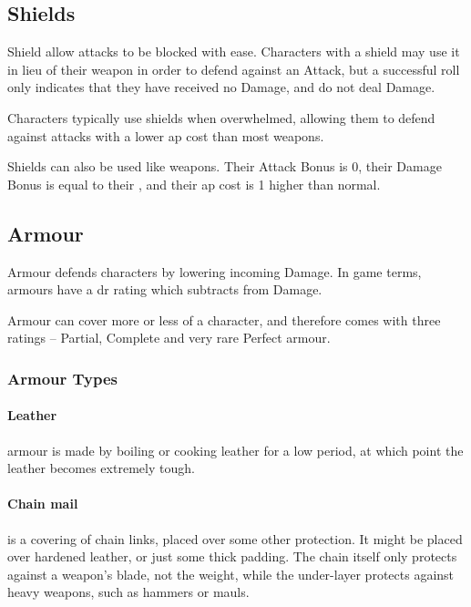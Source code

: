 \begin{multicols}{2}

\subsection{Shields}

Shield allow attacks to be blocked with ease.
Characters with a shield may use it in lieu of their weapon in order to defend against an Attack, but a successful roll only indicates that they have received no Damage, and do not deal Damage.

Characters typically use shields when overwhelmed, allowing them to defend against attacks with a lower \gls{ap} cost than most weapons.

Shields can also be used like weapons.
Their Attack Bonus is 0, their Damage Bonus is equal to their , and their \gls{ap} cost is 1 higher than normal.

\shieldchart

\subsection{Armour}

\armourchart

\noindent
Armour defends characters by lowering incoming Damage.
In game terms, armours have a \gls{dr} rating which subtracts from Damage.

Armour can cover more or less of a character, and therefore comes with three ratings -- Partial, Complete and very rare Perfect armour.

\subsubsection{Armour Types}

\paragraph{Leather}
armour is made by boiling or cooking leather for a low period, at which point the leather becomes extremely tough.

\paragraph{Chain mail}
is a covering of chain links, placed over some other protection.
It might be placed over hardened leather, or just some thick padding.
The chain itself only protects against a weapon's blade, not the weight, while the under-layer protects against heavy weapons, such as hammers or mauls.


\end{multicols}
